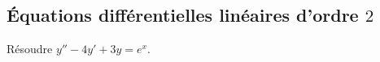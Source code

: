 \documentclass[a4paper,twoside,french,11pt]{VcCours}
\begin{document}


\subsection{Équations différentielles linéaires d'ordre \texorpdfstring{$2$}{2}}


\begin{Exercice}{} Résoudre $y''-4y'+3y=e^x$.
\end{Exercice}
\end{document}
